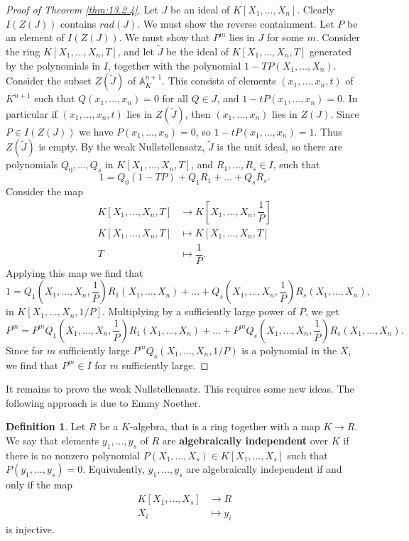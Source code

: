 \documentclass{article}
\newcommand{\A}{\mathbb{A}}
\newcommand{\rb}[1]{\left( #1 \right)}
\renewcommand{\sb}[1]{\left[ #1 \right]}
\theoremstyle{definition}\newtheorem{definition}{Definition}[subsection]
\theoremstyle{definition}\newtheorem{remark}[definition]{Remark}
\theoremstyle{definition}\newtheorem*{example}{Example}
\theoremstyle{definition}\newtheorem*{note}{Note}
\begin{document}
\begin{proof}[Proof of Theorem \ref{thm:13.2.4}]
Let $ J $ be an ideal of $ K\sb{X_1, \dots, X_n} $. Clearly $ I\rb{Z\rb{J}} $ contains $ rad\rb{J} $. We must show the reverse containment. Let $ P $ be an element of $ I\rb{Z\rb{J}} $. We must show that $ P^m $ lies in $ J $ for some $ m $. Consider the ring $ K\sb{X_1, \dots, X_n, T} $, and let $ \widetilde{J} $ be the ideal of $ K\sb{X_1, \dots, X_n, T} $ generated by the polynomials in $ I $, together with the polynomial $ 1 - TP\rb{X_1, \dots, X_n} $. Consider the subset $ Z\rb{\widetilde{J}} $ of $ \A_K^{n + 1} $. This consists of elements $ \rb{x_1, \dots, x_n, t} $ of $ K^{n + 1} $ such that $ Q\rb{x_1, \dots, x_n} = 0 $ for all $ Q \in J $, and $ 1 - tP\rb{x_1, \dots, x_n} = 0 $. In particular if $ \rb{x_1, \dots, x_n, t} $ lies in $ Z\rb{\widetilde{J}} $, then $ \rb{x_1, \dots, x_n} $ lies in $ Z\rb{J} $. Since $ P \in I\rb{Z\rb{J}} $ we have $ P\rb{x_1, \dots, x_n} = 0 $, so $ 1 - tP\rb{x_1, \dots, x_n} = 1 $. Thus $ Z\rb{\widetilde{J}} $ is empty. By the weak Nullstellensatz, $ \widetilde{J} $ is the unit ideal, so there are polynomials $ Q_0, \dots, Q_s $ in $ K\sb{X_1, \dots, X_n, T} $, and $ R_1, \dots, R_s \in I $, such that
$$ 1 = Q_0\rb{1 - TP} + Q_1R_1 + \dots + Q_sR_s. $$
Consider the map
\begin{align*}
K\sb{X_1, \dots, X_n, T} & \to K\sb{X_1, \dots, X_n, \dfrac{1}{P}} \\
K\sb{X_1, \dots, X_n, T} & \mapsto K\sb{X_1, \dots, X_n, T} \\
T & \mapsto \dfrac{1}{P}.
\end{align*}
Applying this map we find that
$$ 1 = Q_1\rb{X_1, \dots, X_n, \dfrac{1}{P}}R_1\rb{X_1, \dots, X_n} + \dots + Q_s\rb{X_1, \dots, X_n, \dfrac{1}{P}}R_s\rb{X_1, \dots, X_n}, $$
in $ K\sb{X_1, \dots, X_n, 1 / P} $. Multiplying by a sufficiently large power of $ P $, we get
$$ P^m = P^mQ_1\rb{X_1, \dots, X_n, \dfrac{1}{P}}R_1\rb{X_1, \dots, X_n} + \dots + P^mQ_s\rb{X_1, \dots, X_n, \dfrac{1}{P}}R_s\rb{X_1, \dots, X_n}. $$
Since for $ m $ sufficiently large $ P^mQ_s\rb{X_1, \dots, X_n, 1 / P} $ is a polynomial in the $ X_i $ we find that $ P^m \in I $ for $ m $ sufficiently large.
\end{proof}

It remains to prove the weak Nullstellensatz. This requires some new ideas. The following approach is due to Emmy Noether.

\begin{definition}
Let $ R $ be a $ K $-algebra, that is a ring together with a map $ K \to R $. We say that elements $ y_1, \dots, y_s $ of $ R $ are \textbf{algebraically independent} over $ K $ if there is no nonzero polynomial $ P\rb{X_1, \dots, X_s} \in K\sb{X_1, \dots, X_s} $ such that $ P\rb{y_1, \dots, y_s} = 0 $. Equivalently, $ y_1, \dots, y_s $ are algebraically independent if and only if the map
\begin{align*}
K\sb{X_1, \dots, X_s} & \to R \\
X_i & \mapsto y_i
\end{align*}
is injective.
\end{definition}
\end{document}
